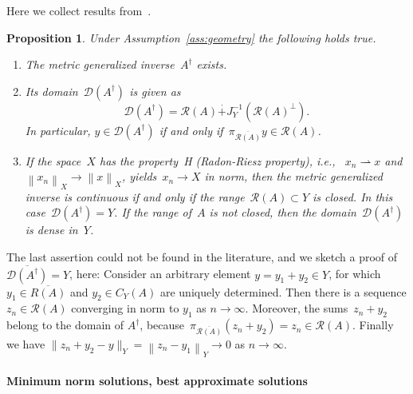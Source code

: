 \documentclass[12pt]{amsart}
\newcommand{\norm}[2]{\left\|#1\right\|_{#2}}
\newcommand{\lr}[1]{\left(#1\right)}
\newcommand{\domain}{\mathcal D}
\newcommand{\range}{\mathcal R}
\newcommand{\Ad}{A^\dag}
\newcommand{\pr}{\pi_{\overline{\range(A)}}}
\newtheorem{proposition}{Proposition}%
\theoremstyle{remark}
\begin{document}
Here we collect results from~\cite[Cor.~3.2 \& Thm.~4.1]{MR2024990}.
\begin{proposition}\label{prop:Ad}
  Under Assumption~\ref{ass:geometry} the following holds true.
  \begin{enumerate}
\item The
  metric generalized inverse~$\Ad$ exists.
\item Its domain~$\domain(\Ad)$ is given as
\begin{equation}
  \label{eq:domainAd}
   \domain(\Ad) = \range(A) \stackrel{\cdot}{+} J_{Y}^{-1}\lr{\range(A)^{\perp}}.
 \end{equation}
  In particular,
  $y\in\domain(\Ad)$ if and only if~$\pi_{\overline{\range(A)}}y  \in\range(A)$.
  \item If the space~$X$ has the property~H (Radon-Riesz property), i.e.,
    ~$x_{n}\rightharpoonup x$ and~$\norm{x_{n}}{X} \to \norm{x}{X}$,
    yields~$x_{n} \to X$ in norm, then the metric generalized inverse
    is continuous if and only if the range~$\range(A)\subset Y$
    is closed. In this case~$\domain(\Ad)=Y$.
    If the range of~$A$ is not closed, then the domain~$\domain(\Ad)$ is dense in~$Y$.
  \end{enumerate}
\end{proposition}
The last assertion could not be found in the literature, and we sketch a proof of~$\overline{\domain(A^\dagger)}=Y$, here:
Consider an arbitrary
element $y=y_1+y_2 \in Y$, for which $y_1 \in \overline{R(A)}$ and $y_2 \in C_Y(A)$ are uniquely determined. Then there is a sequence $z_n \in \range(A)$ converging in norm to $y_1$ as $n \to \infty$. Moreover, the sums~$z_n+y_2$ belong to the domain of $A^\dagger$, because~$\pr (z_n + y_2) = z_n\in\range(A)$. Finally we have $\|z_n+y_2-y\|_Y = \norm{z_n - y_1}{Y} \to 0$ as $n \to \infty$.

\medskip

\paragraph{{\bf Minimum norm solutions, best approximate solutions}}
\end{document}
